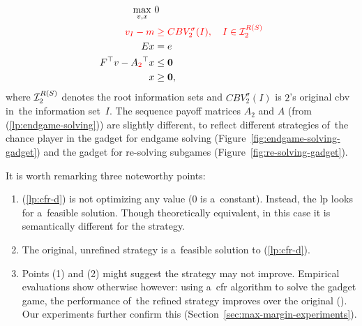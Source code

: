 \begin{equation}
  \label{lp:cfr-d}
  \begin{split}
    \max_{v, x}\ &0 \\
    \color{red}
      v_I - m &
    \color{red}
      \ge CBV_2^\sigma(I), \quad I \in \mathcal{I}_2^{R(S)}\\ 
    Ex &= e \\
    F^\top v - A_{\color{red}2}^\top x &\le \boldsymbol{0} \\
    x &\ge \boldsymbol{0},
  \end{split}
\end{equation}
where $\mathcal{I}_2^{R(S)}$ denotes the root information sets and $CBV_2^\sigma(I)$ is $2$'s original \acrlong{cbv} in~the information set~$I$.
The sequence payoff matrices $A_2$ and $A$ (from (\ref{lp:endgame-solving})) are slightly different, to reflect different strategies of~the chance player in the gadget for endgame solving (Figure~\ref{fig:endgame-solving-gadget}) and the gadget for re-solving subgames (Figure~\ref{fig:re-solving-gadget}).

It is worth remarking three noteworthy points:
\begin{enumerate}[(1)]
  \item (\ref{lp:cfr-d}) is not optimizing any value ($0$ is a~constant).
    Instead, the \acrshort{lp} looks for a~feasible solution.
    Though theoretically equivalent, in this case it is semantically different for the strategy.
  \item The original, unrefined strategy is a~feasible solution to (\ref{lp:cfr-d}).
  \item Points (1) and (2) might suggest the strategy may not improve.
    Empirical evaluations show otherwise however:
    using a~\acrshort{cfr} algorithm to solve the gadget game, the performance of~the refined strategy improves over the original (\cite{BurchJohansonBowling13}).
    Our experiments further confirm this (Section~\ref{sec:max-margin-experiments}).
\end{enumerate}

